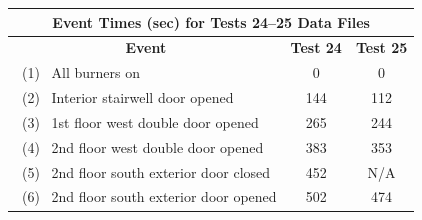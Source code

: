 \begin{figure}[!ht]
\renewcommand{\baselinestretch}{1}
\begin{minipage}[b]{0.88\columnwidth}
\begin{center}
	\begin{tabular}{lcc}
	\multicolumn{3}{c}{Event Times (sec) for Tests 24--25 Data Files} \\
	\toprule
	\multicolumn{1}{c}{\textbf{Event}} 			& \textbf{Test 24}	& \textbf{Test 25} \\
	\midrule
	~(1)~ All burners on 						&   0		  		&	 0			\\
	~(2)~ Interior stairwell door opened 		&   144		  		&    112		\\
	~(3)~ 1st floor west double door opened 	&	265		  		&    244 	 	\\
	~(4)~ 2nd floor west double door opened 	&   383			  	&    353		\\
	~(5)~ 2nd floor south exterior door closed	&   452			  	&    N/A		\\
	~(6)~ 2nd floor south exterior door opened	&   502			  	&    474		\\

\end{tabular}
\end{center}
\end{minipage}
\end{figure}
